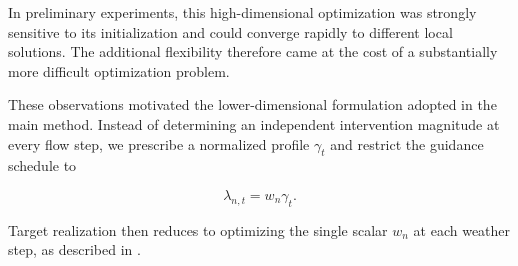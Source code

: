 In preliminary experiments, this high-dimensional optimization was strongly
sensitive to its initialization and could converge rapidly to different local
solutions. The additional flexibility therefore came at the cost of a
substantially more difficult optimization problem.

These observations motivated the lower-dimensional formulation adopted in the
main method. Instead of determining an independent intervention magnitude at
every flow step, we prescribe a normalized profile $\gamma_t$ and restrict the
guidance schedule to

\begin{equation}
    \lambda_{n,t}
    =
    w_n\gamma_t.
\end{equation}

Target realization then reduces to optimizing the single scalar $w_n$ at each
weather step, as described in .